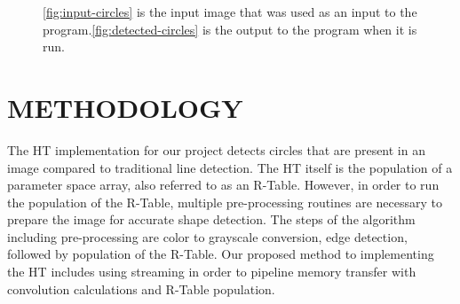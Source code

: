 \documentclass[12pt]{article}
\begin{document}
\begin{figure}%
  \centering
  \hfil
  \caption{\ref{fig:input-circles} is the input image that was used as an input to the program.\ref{fig:detected-circles} is the output to the program when it is run.}
\end{figure}


\section{\MakeUppercase{Methodology}}
\label{sec:Methodology}
The HT implementation for our project detects circles that are present in an image compared to traditional line detection.
The HT itself is the population of a parameter space array, also referred to as an R-Table.
However, in order to run the population of the R-Table, multiple pre-processing routines are necessary to prepare the image for accurate shape detection.
The steps of the algorithm including pre-processing are color to grayscale conversion, edge detection, followed by population of the R-Table.
Our proposed method to implementing the HT includes using streaming in order to pipeline memory transfer with convolution calculations and R-Table population.
\end{document}
